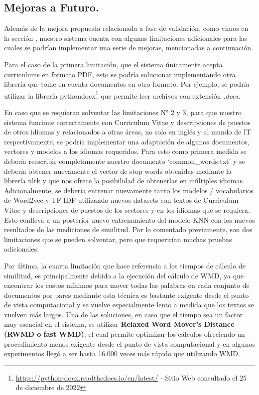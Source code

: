 \documentclass[12pt,a4paper]{article}
\begin{document}
\begin{sloppypar}
\cleardoublepage

\subsection{Mejoras a Futuro.}

Además de la mejora propuesta relacionada a fase de validación, como vimos en la sección \textit{}, nuestro sistema cuenta con algunas limitaciones adicionales para las cuales se podrían implementar una serie de mejoras, mencionadas a continuación. 

Para el caso de la primera limitación, que el sistema únicamente acepta curriculums en formato PDF, esto se podría solucionar implementando otra librería que tome en cuenta documentos en otro formato. Por ejemplo, se podría utilizar la librería python\-docx\footnote{\url{https://python-docx.readthedocs.io/en/latest/} - Sitio Web consultado el 25 de diciembre de 2022} que permite leer archivos con extensión \textit{.docx}.

En caso que se requieran solventar las limitaciones N° 2 y 3, para que nuestro sistema funcione correctamente con Curriculum Vitae y descripciones de puestos de otros idiomas y relacionados a otras áreas, no solo en inglés y al mundo de IT respectivamente, se podría implementar una adaptación de algunos documentos, vectores y modelos a los idiomas requeridos. Para esto como primera medida se debería reescribir completamente nuestro documento ‘common\_words.txt’ y se debería obtener nuevamente el vector de stop words obtenidas mediante la librería nltk y que nos ofrece la posibilidad de obtenerlas en múltiples idiomas. Adicionalmente, se debería entrenar nuevamente tanto los modelos / vocabularios de Word2vec y TF-IDF utilizando nuevos datasets con textos de Curriculum Vitae y descripciones de puestos de los sectores y en los idiomas que se requiera. Esto conlleva a un posterior nuevo entrenamiento del modelo KNN con los nuevos resultados de las mediciones de similitud. Por lo comentado previamente, son dos limitaciones que se pueden solventar, pero que requerirían muchas pruebas adicionales.

Por último, la cuarta limitación que hace referencia a los tiempos de cálculo de similitud, es principalmente debido a la ejecución del cálculo de WMD, ya que encontrar los costos mínimos para mover todas las palabras en cada conjunto de documentos por pares mediante esta técnica es bastante exigente desde el punto de vista computacional y se vuelve especialmente lento a medida que los textos se vuelven más largos. Una de las soluciones, en caso que el tiempo sea un factor muy esencial en el sistema, es utilizar \textbf{Relaxed Word Mover’s Distance (RWMD o fast WMD)}, el cual permite optimizar los cálculos ofreciendo un procedimiento menos exigente desde el punto de vista computacional\cite{NLP_21} y en algunos experimentos llegó a ser hasta 16.000 veces más rápido que utilizando WMD\cite{NLP_conclus}. 


\end{sloppypar}
\end{document}
